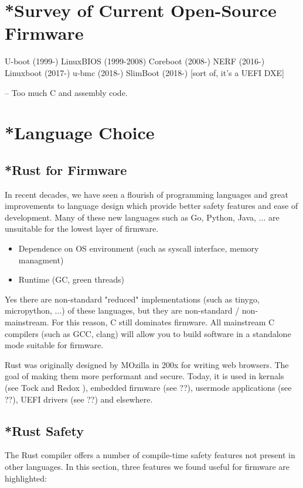 \documentclass[conference]{IEEEtran}
\begin{document}
\section{*Survey of Current Open-Source Firmware}

U-boot (1999-)
LinuxBIOS (1999-2008)
Coreboot (2008-)
NERF (2016-)
Linuxboot (2017-)
u-bmc (2018-)
SlimBoot (2018-) [sort of, it’s a UEFI DXE]

-- Too much C and assembly code.

\section{*Language Choice}

\subsection{*Rust for Firmware}

In recent decades, we have seen a flourish of programming languages and great improvements to language design which provide better safety features and ease of development. Many of these new languages such as Go, Python, Java, ... are unsuitable for the lowest layer of firmware.

\begin{itemize}
    \item Dependence on OS environment (such as syscall interface, memory managment)
    \item Runtime (GC, green threads)
\end{itemize}

Yes there are non-standard "reduced" implementations (such as tinygo, micropython, ...) of these languages, but they are non-standard / non-mainstream. For this reason, C still dominates firmware. All mainstream C compilers (such as GCC, clang) will allow you to build software in a standalone mode suitable for firmware.

Rust was originally designed by MOzilla in 200x for writing web browsers. The goal of making them more performant and secure. Today, it is used in kernals (see Tock \cite{b1} and Redox \cite{b3}), embedded firmware (see ??), usermode applications (see ??), UEFI drivers (see ??) and elsewhere.

\subsection{*Rust Safety}

The Rust compiler offers a number of compile-time safety features not present in other languages. In this section, three features we found useful for firmware are highlighted:
\end{document}

